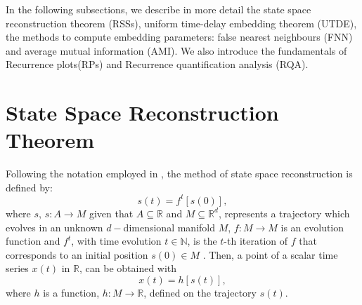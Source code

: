 
In the following subsections, we describe in more detail the state space 
reconstruction theorem (RSSs), uniform time-delay embedding theorem (UTDE),
the methods to compute embedding parameters: false nearest neighbours (FNN)
and average mutual information (AMI).
We also introduce the fundamentals of Recurrence plots(RPs) and 
Recurrence quantification analysis (RQA).

\section{State Space Reconstruction Theorem} \label{sec:rss}
Following the notation employed in \cite{casdagli1991, garland2016, 
gibson1992, uzal2011, uzal2010, takens1981}, the method of state space 
reconstruction is defined by:
\begin{equation}\label{eq:ssr}
  s(t)=f^t [s(0)],
\end{equation}
where $s$, $s: A \rightarrow M$ given that $A \subseteq \mathbb{R}$ and $M 
\subseteq \mathbb{R}^d$, represents a trajectory which evolves in an 
unknown $d-$dimensional manifold $M$, $f: M \rightarrow M$ is an evolution 
function and $f^t$, with time evolution $t \in \mathbb{N}$, is the $t$-th 
iteration of $f$ that corresponds to an initial position $s(0) \in M $ 
\citep{takens1981}.
Then, a point of a scalar time series $x(t)$ in $\mathbb{R}$, can be obtained 
with
\begin{equation}\label{eq:measurement}
	x(t)=h[s(t)],
\end{equation}
where $h$ is a function, $h: M \rightarrow \mathbb{R}$, defined on the 
trajectory $s(t)$.

